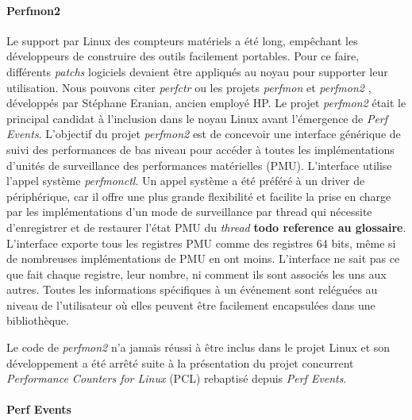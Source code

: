         \paragraph{Perfmon2}
            Le support par Linux des compteurs matériels a été long, empêchant les développeurs de construire des outils facilement portables. Pour ce faire, différents \textit{patchs} logiciels devaient être appliqués au noyau pour supporter leur utilisation. Nous pouvons citer \textit{perfctr} \cite{Pettersson2005} ou les projets \textit{perfmon} et \textit{perfmon2} \cite{Eranian2006}, développés par Stéphane Eranian, ancien employé HP. Le projet \textit{perfmon2} était le principal candidat à l'inclusion dans le noyau Linux avant l'émergence de \textit{Perf Events}. L'objectif du projet \textit{perfmon2} est de concevoir une interface générique de suivi des performances de bas niveau pour accéder à toutes les implémentations d'unités de surveillance des performances matérielles (PMU).
            L'interface utilise l'appel système \textit{perfmonctl}. Un appel système a été préféré à un driver de périphérique, car il offre une plus grande flexibilité et facilite la prise en charge par les implémentations d'un mode de surveillance par thread qui nécessite d'enregistrer et de restaurer l'état PMU du \textit{thread} \textbf{todo reference au glossaire}. L'interface exporte tous les registres PMU comme des registres 64 bits, même si de nombreuses implémentations de PMU en ont moins. L'interface ne sait pas ce que fait chaque registre, leur nombre, ni comment ils sont associés les uns aux autres. Toutes les informations spécifiques à un événement sont reléguées au niveau de l'utilisateur où elles peuvent être facilement encapsulées dans une bibliothèque.
        
            Le code de \textit{perfmon2} n'a jamais réussi à être inclus dans le projet Linux et son développement a été arrêté suite à la présentation du projet concurrent \textit{Performance Counters for Linux} (PCL) rebaptisé depuis \textit{Perf Events}.

        \paragraph{Perf Events}\label{sec:edl_profiling_perf}
        
